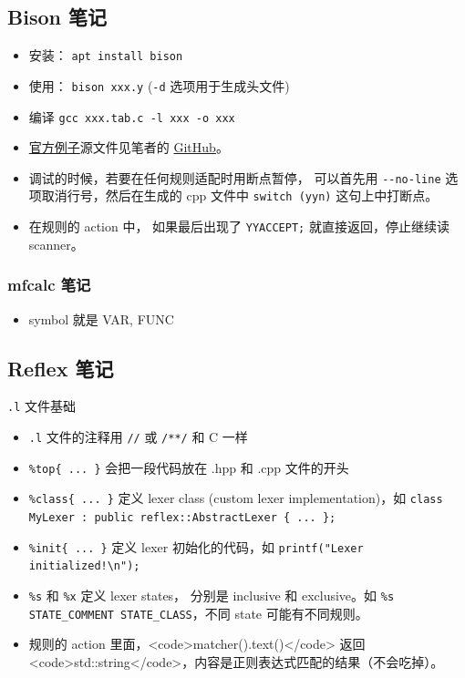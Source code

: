 \subsection{Bison 笔记}
\begin{itemize}
\item 安装： \verb`apt install bison`
\item 使用： \verb`bison xxx.y` (\verb`-d` 选项用于生成头文件)
\item 编译 \verb`gcc xxx.tab.c -l xxx -o xxx`
\item \href{http://web.mit.edu/gnu/doc/html/bison_5.html}{官方例子}源文件见笔者的 \href{https://github.com/MacroUniverse/bison_test}{GitHub}。
\item 调试的时候，若要在任何规则适配时用断点暂停， 可以首先用 \verb`--no-line` 选项取消行号，然后在生成的 cpp 文件中 \verb`switch (yyn)` 这句上中打断点。
\item 在规则的 action 中， 如果最后出现了 \verb`YYACCEPT;` 就直接返回，停止继续读 scanner。
\end{itemize}

\subsubsection{mfcalc 笔记}
\begin{itemize}
\item symbol 就是 VAR, FUNC
\end{itemize}

\subsection{Reflex 笔记}
\verb`.l` 文件基础
\begin{itemize}
\item \verb`.l` 文件的注释用 \verb`//` 或 \verb`/**/` 和 C 一样
\item \verb`%top{ ... }` 会把一段代码放在 .hpp 和 .cpp 文件的开头
\item \verb`%class{ ... }` 定义 lexer class (custom lexer implementation)，如 \verb`class MyLexer : public reflex::AbstractLexer { ... };`
\item \verb`%init{ ... }` 定义 lexer 初始化的代码，如 \verb`printf("Lexer initialized!\n");`
\item \verb`%s` 和 \verb`%x` 定义 lexer states， 分别是 inclusive 和 exclusive。如 \verb`%s STATE_COMMENT STATE_CLASS`，不同 state 可能有不同规则。
\item 规则的 action 里面，<code>matcher().text()</code> 返回 <code>std::string</code>，内容是正则表达式匹配的结果（不会吃掉）。
\end{itemize}
